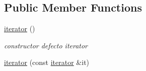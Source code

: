 \subsection*{Public Member Functions}
\begin{DoxyCompactItemize}
\item 
\hypertarget{classconjunto_1_1iterator_a3f22236830d397ec750b795e4358492d}{\hyperlink{classconjunto_1_1iterator_a3f22236830d397ec750b795e4358492d}{iterator} ()}\label{classconjunto_1_1iterator_a3f22236830d397ec750b795e4358492d}

\begin{DoxyCompactList}\small\item\em constructor defecto iterator \end{DoxyCompactList}\item 
\hypertarget{classconjunto_1_1iterator_ae6ffce98c8835de978c7b8f0a769a1fe}{\hyperlink{classconjunto_1_1iterator_ae6ffce98c8835de978c7b8f0a769a1fe}{iterator} (const \hyperlink{classconjunto_1_1iterator}{iterator} \&it)}\label{classconjunto_1_1iterator_ae6ffce98c8835de978c7b8f0a769a1fe}


\end{DoxyCompactItemize}
